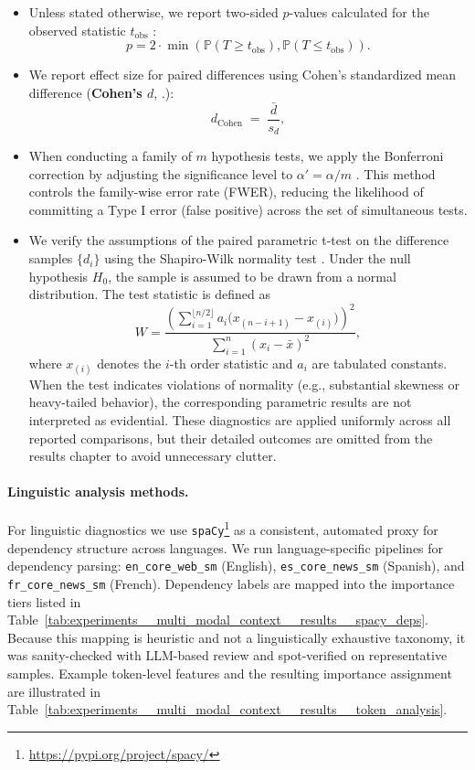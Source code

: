 \begin{itemize}
    \item Unless stated otherwise, we report two-sided $p$-values calculated for the observed statistic $t_{\text{obs}}$ \parencite{student1908probable}:
        \[
        p = 2 \cdot \min \left( \mathbb{P}(T \ge t_{\text{obs}}), \mathbb{P}(T \le t_{\text{obs}}) \right).
        \]
    \item We report effect size for paired differences using Cohen's standardized mean difference (\textbf{Cohen's $d$}, \cite{cohen1988statistical}.):
         \[
        d_{\text{Cohen}} \;=\; \frac{\bar{d}}{s_d},
        \]

    \item When conducting a family of $m$ hypothesis tests, we apply the Bonferroni correction by adjusting the significance level to $\alpha' = \alpha / m$ \parencite{dunn1961multiple}. This method controls the family-wise error rate (FWER), reducing the likelihood of committing a Type I error (false positive) across the set of simultaneous tests.

    \item We verify the assumptions of the paired parametric t-test on the difference samples $\{d_i\}$ using the Shapiro-Wilk normality test \parencite{shapiro1965analysis}. Under the null hypothesis $H_0$, the sample is assumed to be drawn from a normal distribution. The test statistic is defined as
        \[
        W = \frac{\left( \sum_{i=1}^{\lfloor n/2 \rfloor} a_i \bigl(x_{(n-i+1)} - x_{(i)}\bigr) \right)^2}{\sum_{i=1}^{n} (x_i - \bar{x})^2},
        \]
        where $x_{(i)}$ denotes the $i$-th order statistic and $a_i$ are tabulated constants. When the test indicates violations of normality (e.g., substantial skewness or heavy-tailed behavior), the corresponding parametric results are not interpreted as evidential. These diagnostics are applied uniformly across all reported comparisons, but their detailed outcomes are omitted from the results chapter to avoid unnecessary clutter.
\end{itemize}

\newpage
\paragraph{Linguistic analysis methods.}
For linguistic diagnostics we use \texttt{spaCy}\footnote{\url{https://pypi.org/project/spacy/}} \parencite{honnibal2017spacy2} as a consistent, automated proxy for dependency structure across languages. We run language-specific pipelines for dependency parsing: \texttt{en\_core\_web\_sm} (English), \texttt{es\_core\_news\_sm} (Spanish), and \texttt{fr\_core\_news\_sm} (French). Dependency labels are mapped into the importance tiers listed in Table~\ref{tab:experiments__multi_modal_context__results__spacy_deps}. Because this mapping is heuristic and not a linguistically exhaustive taxonomy, it was sanity-checked with LLM-based review and spot-verified on representative samples. Example token-level features and the resulting importance assignment are illustrated in Table~\ref{tab:experiments__multi_modal_context__results__token_analysis}.

